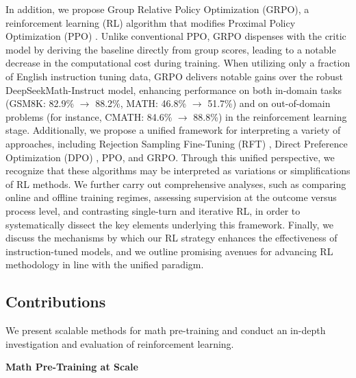 In addition, we propose Group Relative Policy Optimization (GRPO), a reinforcement learning (RL) algorithm that modifies Proximal Policy Optimization (PPO) \citep{schulman2017proximal}. Unlike conventional PPO, GRPO dispenses with the critic model by deriving the baseline directly from group scores, leading to a notable decrease in the computational cost during training. When utilizing only a fraction of English instruction tuning data, GRPO delivers notable gains over the robust DeepSeekMath-Instruct model, enhancing performance on both in-domain tasks (GSM8K: 82.9\% $\rightarrow$ 88.2\%, MATH: 46.8\% $\rightarrow$ 51.7\%) and on out-of-domain problems (for instance, CMATH: 84.6\% $\rightarrow$ 88.8\%) in the reinforcement learning stage. Additionally, we propose a unified framework for interpreting a variety of approaches, including Rejection Sampling Fine-Tuning (RFT) \citep{yuan2023scaling}, Direct Preference Optimization (DPO) \citep{dpo}, PPO, and GRPO. Through this unified perspective, we recognize that these algorithms may be interpreted as variations or simplifications of RL methods. We further carry out comprehensive analyses, such as comparing online and offline training regimes, assessing supervision at the outcome versus process level, and contrasting single-turn and iterative RL, in order to systematically dissect the key elements underlying this framework. Finally, we discuss the mechanisms by which our RL strategy enhances the effectiveness of instruction-tuned models, and we outline promising avenues for advancing RL methodology in line with the unified paradigm.

\subsection{Contributions}
We present scalable methods for math pre-training and conduct an in-depth investigation and evaluation of reinforcement learning.

\textbf{Math Pre-Training at Scale}

